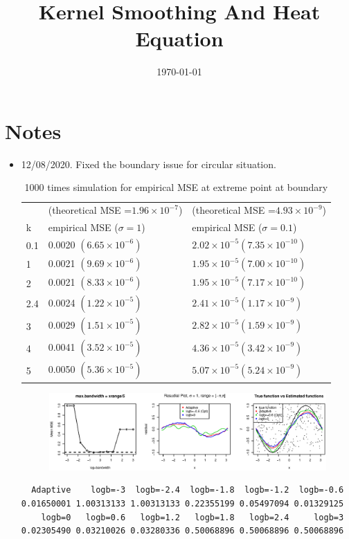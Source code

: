 \documentclass{article}
\title{Kernel Smoothing And Heat Equation}
\date{\today}
\begin{document}
\maketitle

\section{Notes}
\label{sec:notes}

\begin{itemize}
\item 12/08/2020. 
Fixed the boundary issue for circular situation.

\begin{table}[H]
\centering
\begin{tabular}{l|l| l}
\hline\hline
& (theoretical MSE =$1.96\times 10^{-7}$) & (theoretical MSE =$4.93\times 10^{-9}$)\\
k & empirical MSE  ($\sigma=1$) &empirical MSE  ($\sigma=0.1$) \\\hline 
0.1&0.0020 $(6.65\times 10^{-6})$ & $2.02\times 10^{-5} (7.35\times 10^{-10})$\\
1 & 0.0021 $(9.69\times 10^{-6})$ & $1.95\times 10^{-5}  (7.00\times 10^{-10})$\\
2 & 0.0021 $(8.33\times 10^{-6})$ & $1.95\times 10^{-5} (7.17\times 10^{-10})$\\
2.4 & 0.0024 $(1.22\times 10^{-5})$ & $2.41\times 10^{-5} (1.17\times 10^{-9})$\\
3 & 0.0029 $(1.51\times 10^{-5})$ & $2.82\times 10^{-5} (1.59\times 10^{-9})$\\
4 & 0.0041 $(3.52\times 10^{-5})$ &  $4.36\times 10^{-5} (3.42\times 10^{-9})$\\
5 & 0.0050 $(5.36\times 10^{-5})$ &  $5.07\times 10^{-5} (5.24\times 10^{-9})$\\\hline
\end{tabular}
\caption{1000 times simulation for empirical MSE at extreme point at boundary}
\end{table}


\begin{figure}[H]
\includegraphics[width=\linewidth]{pic/sim.plot10.eps}
\end{figure}
\begin{verbatim}
  Adaptive    logb=-3  logb=-2.4  logb=-1.8  logb=-1.2  logb=-0.6 
0.01650001 1.00313133 1.00313133 0.22355199 0.05497094 0.01329125 
    logb=0   logb=0.6   logb=1.2   logb=1.8   logb=2.4     logb=3 
0.02305490 0.03210026 0.03280336 0.50068896 0.50068896 0.50068896
\end{verbatim}


\end{itemize}
\end{document}
